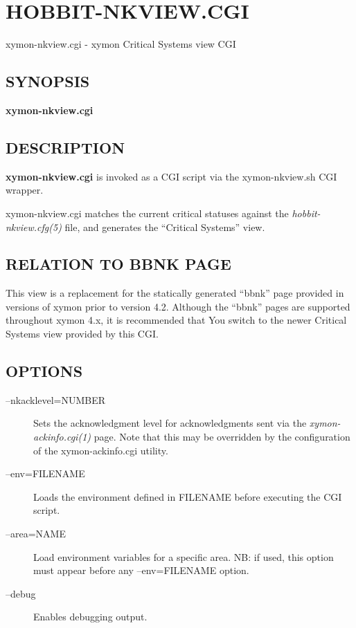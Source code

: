 %
%
\newpage
\section{HOBBIT-NKVIEW.CGI}

xymon-nkview.cgi - xymon Critical Systems view CGI

 \subsection{SYNOPSIS}
\textbf{xymon-nkview.cgi}


 
\subsection{DESCRIPTION}
\textbf{xymon-nkview.cgi}
 is invoked as a CGI script via the xymon-nkview.sh CGI wrapper. 

  xymon-nkview.cgi matches the current critical statuses against the \emph{hobbit-nkview.cfg(5)}
 file, and generates the ``Critical Systems'' view. 


 
\subsection{RELATION TO BBNK PAGE}
 This view is a replacement for the statically generated ``bbnk'' page
 provided in versions of xymon prior to version 4.2. Although the
 ``bbnk'' pages are supported throughout xymon 4.x, it is recommended
 that You switch to the newer Critical Systems view provided by this
 CGI. 


 
\subsection{OPTIONS}
\begin{description}
\item[--nkacklevel=NUMBER] Sets the acknowledgment level for
  acknowledgments sent via the \emph{xymon-ackinfo.cgi(1)} page. Note
  that this may be overridden by the configuration of the
  xymon-ackinfo.cgi utility. 


 

\item[--env=FILENAME] Loads the environment defined in FILENAME before
  executing the CGI script. 


 

\item[--area=NAME] Load environment variables for a specific area. NB:
  if used, this option must appear before any --env=FILENAME option. 


 

\item[--debug] Enables debugging output. 

 


\end{description}
